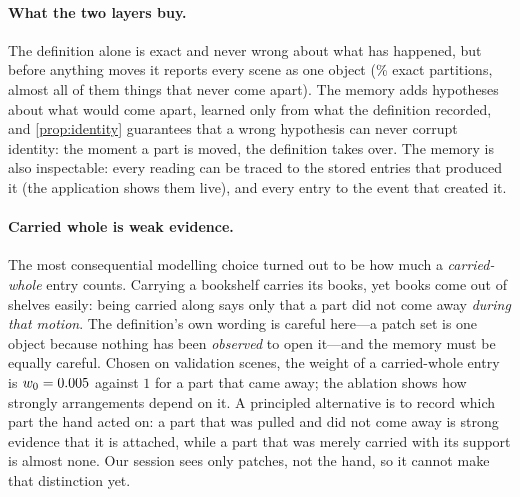 \paragraph{What the two layers buy.}
The definition alone is exact and never wrong about what has happened, but before anything moves it reports every scene as one object (\accNever\% exact partitions, almost all of them things that never come apart). The memory adds hypotheses about what would come apart, learned only from what the definition recorded, and \cref{prop:identity} guarantees that a wrong hypothesis can never corrupt identity: the moment a part is moved, the definition takes over. The memory is also inspectable: every reading can be traced to the stored entries that produced it (the application shows them live), and every entry to the event that created it.

\paragraph{Carried whole is weak evidence.}
The most consequential modelling choice turned out to be how much a \emph{carried-whole} entry counts. Carrying a bookshelf carries its books, yet books come out of shelves easily: being carried along says only that a part did not come away \emph{during that motion}. The definition's own wording is careful here---a patch set is one object because nothing has been \emph{observed} to open it---and the memory must be equally careful. Chosen on validation scenes, the weight of a carried-whole entry is $w_0=0.005$ against $1$ for a part that came away; the ablation shows how strongly arrangements depend on it. A principled alternative is to record which part the hand acted on: a part that was pulled and did not come away is strong evidence that it is attached, while a part that was merely carried with its support is almost none. Our session sees only patches, not the hand, so it cannot make that distinction yet.

